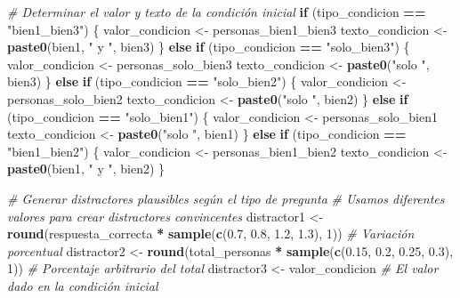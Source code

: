 \documentclass[
]{article}
\newenvironment{Shaded}{\begin{snugshade}}{\end{snugshade}}
\newcommand{\CommentTok}[1]{\textcolor[rgb]{0.56,0.35,0.01}{\textit{#1}}}
\newcommand{\ControlFlowTok}[1]{\textcolor[rgb]{0.13,0.29,0.53}{\textbf{#1}}}
\newcommand{\DecValTok}[1]{\textcolor[rgb]{0.00,0.00,0.81}{#1}}
\newcommand{\FloatTok}[1]{\textcolor[rgb]{0.00,0.00,0.81}{#1}}
\newcommand{\FunctionTok}[1]{\textcolor[rgb]{0.13,0.29,0.53}{\textbf{#1}}}
\newcommand{\NormalTok}[1]{#1}
\newcommand{\OtherTok}[1]{\textcolor[rgb]{0.56,0.35,0.01}{#1}}
\newcommand{\SpecialCharTok}[1]{\textcolor[rgb]{0.81,0.36,0.00}{\textbf{#1}}}
\newcommand{\StringTok}[1]{\textcolor[rgb]{0.31,0.60,0.02}{#1}}
\begin{document}
\begin{Shaded}
\begin{Highlighting}[]
\CommentTok{\# Determinar el valor y texto de la condición inicial}
\ControlFlowTok{if}\NormalTok{ (tipo\_condicion }\SpecialCharTok{==} \StringTok{"bien1\_bien3"}\NormalTok{) \{}
\NormalTok{  valor\_condicion }\OtherTok{\textless{}{-}}\NormalTok{ personas\_bien1\_bien3}
\NormalTok{  texto\_condicion }\OtherTok{\textless{}{-}} \FunctionTok{paste0}\NormalTok{(bien1, }\StringTok{" y "}\NormalTok{, bien3)}
\NormalTok{\} }\ControlFlowTok{else} \ControlFlowTok{if}\NormalTok{ (tipo\_condicion }\SpecialCharTok{==} \StringTok{"solo\_bien3"}\NormalTok{) \{}
\NormalTok{  valor\_condicion }\OtherTok{\textless{}{-}}\NormalTok{ personas\_solo\_bien3}
\NormalTok{  texto\_condicion }\OtherTok{\textless{}{-}} \FunctionTok{paste0}\NormalTok{(}\StringTok{"solo "}\NormalTok{, bien3)}
\NormalTok{\} }\ControlFlowTok{else} \ControlFlowTok{if}\NormalTok{ (tipo\_condicion }\SpecialCharTok{==} \StringTok{"solo\_bien2"}\NormalTok{) \{}
\NormalTok{  valor\_condicion }\OtherTok{\textless{}{-}}\NormalTok{ personas\_solo\_bien2}
\NormalTok{  texto\_condicion }\OtherTok{\textless{}{-}} \FunctionTok{paste0}\NormalTok{(}\StringTok{"solo "}\NormalTok{, bien2)}
\NormalTok{\} }\ControlFlowTok{else} \ControlFlowTok{if}\NormalTok{ (tipo\_condicion }\SpecialCharTok{==} \StringTok{"solo\_bien1"}\NormalTok{) \{}
\NormalTok{  valor\_condicion }\OtherTok{\textless{}{-}}\NormalTok{ personas\_solo\_bien1}
\NormalTok{  texto\_condicion }\OtherTok{\textless{}{-}} \FunctionTok{paste0}\NormalTok{(}\StringTok{"solo "}\NormalTok{, bien1)}
\NormalTok{\} }\ControlFlowTok{else} \ControlFlowTok{if}\NormalTok{ (tipo\_condicion }\SpecialCharTok{==} \StringTok{"bien1\_bien2"}\NormalTok{) \{}
\NormalTok{  valor\_condicion }\OtherTok{\textless{}{-}}\NormalTok{ personas\_bien1\_bien2}
\NormalTok{  texto\_condicion }\OtherTok{\textless{}{-}} \FunctionTok{paste0}\NormalTok{(bien1, }\StringTok{" y "}\NormalTok{, bien2)}
\NormalTok{\}}

\CommentTok{\# Generar distractores plausibles según el tipo de pregunta}
\CommentTok{\# Usamos diferentes valores para crear distractores convincentes}
\NormalTok{distractor1 }\OtherTok{\textless{}{-}} \FunctionTok{round}\NormalTok{(respuesta\_correcta }\SpecialCharTok{*} \FunctionTok{sample}\NormalTok{(}\FunctionTok{c}\NormalTok{(}\FloatTok{0.7}\NormalTok{, }\FloatTok{0.8}\NormalTok{, }\FloatTok{1.2}\NormalTok{, }\FloatTok{1.3}\NormalTok{), }\DecValTok{1}\NormalTok{))  }\CommentTok{\# Variación porcentual}
\NormalTok{distractor2 }\OtherTok{\textless{}{-}} \FunctionTok{round}\NormalTok{(total\_personas }\SpecialCharTok{*} \FunctionTok{sample}\NormalTok{(}\FunctionTok{c}\NormalTok{(}\FloatTok{0.15}\NormalTok{, }\FloatTok{0.2}\NormalTok{, }\FloatTok{0.25}\NormalTok{, }\FloatTok{0.3}\NormalTok{), }\DecValTok{1}\NormalTok{))    }\CommentTok{\# Porcentaje arbitrario del total}
\NormalTok{distractor3 }\OtherTok{\textless{}{-}}\NormalTok{ valor\_condicion  }\CommentTok{\# El valor dado en la condición inicial}


\end{Highlighting}
\end{Shaded}
\end{document}

